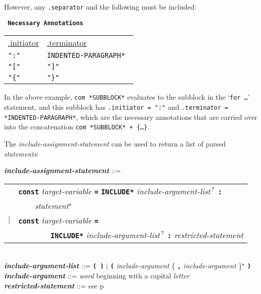 \documentclass[12pt]{article}
\newcommand{\TT}[1]{{\tt \bfseries #1}}
\newcommand{\STAR}{{\Large $^\star$}}
\newcommand{\QMARK}{{$^{\,\mbox{\footnotesize ?}}$}}
\newcommand{\emkey}[1]{{\em \bfseries #1}}
\newcommand{\pagref}[1]{p\pageref{#1}}
\newenvironment{indpar}[1][0.3in]%
	{\begin{list}{}%
		     {\setlength{\itemsep}{0in}%
		      \setlength{\topsep}{0in}%
		      \setlength{\parsep}{1ex}%
		      \setlength{\labelwidth}{#1}%
		      \setlength{\leftmargin}{#1}%
		      \addtolength{\leftmargin}{\labelsep}}%
	 \item}%
	{\end{list}}
\begin{document}
However, any {\tt .separator} and the following must be included:

\begin{center} \tt
{\rm \bf Necessary Annotations}
\\[1ex]
\begin{tabular}{l@{~~~~~~~~~~}l}
\underline{.initiator} & \underline{.terminator}
\\[1ex]
\tt ":" & \tt *INDENTED-PARAGRAPH* \\
\tt "[" & \tt "]" \\
\tt "\{" & \tt "\}" \\
\end{tabular}
\end{center}

In the above example, {\tt com *SUBBLOCK*} evaluates to the
subblock in the `{\tt for \ldots}' statement, and this subblock
has {\tt .initiator = ":"} and {\tt .terminator = *INDENTED-PARA\-GRAPH*},
which are the necessary annotations that are carried over into
the concatenation
{\tt com *SUBBLOCK* + \{\ldots\}}.

The {\em include-assignment-statement} can be used to return a list
of parsed {\em statements}:

\begin{indpar}
\emkey{include-assignment-statement}\label{INCLUDE-ASSIGNMENT-STATEMENT} ::= \\
\hspace*{0.3in}
    \begin{tabular}[t]{rl}
    & \TT{const} {\em target-variable} \TT{=} \TT{*INCLUDE*}
    	{\em include-argument-list}\QMARK{} \TT{:} \\
    & \TT{~~~~}{\em statement}\STAR{} \\
    $|$ & \TT{const} {\em target-variable} \TT{=} \\
    & ~~~~~~~~\TT{*INCLUDE*}
    	{\em include-argument-list}\QMARK{} \TT{:}
	{\em restricted-statement} \\
    \end{tabular}
\\[0.5ex]
\emkey{include-argument-list} ::= \TT{( )} $|$
	\TT{(} {\em include-argument}
	\{ \TT{,} {\em include-argument} \}\STAR{} \TT{)}
\\[0.5ex]
\emkey{include-argument} ::= {\em word} beginning with a capital {\em letter}
\\[0.5ex]
\emkey{restricted-statement} ::= see \pagref{RESTRICTED-STATEMENT}

\end{indpar}
\end{document}
